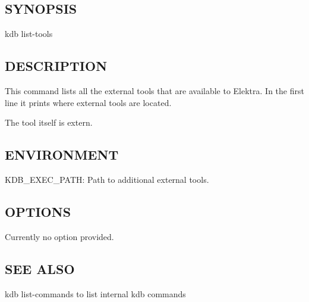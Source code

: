 \subsection*{S\+Y\+N\+O\+P\+S\+IS}

{\ttfamily kdb list-\/tools}

\subsection*{D\+E\+S\+C\+R\+I\+P\+T\+I\+ON}

This command lists all the external tools that are available to Elektra. In the first line it prints where external tools are located.

The tool itself is extern.

\subsection*{E\+N\+V\+I\+R\+O\+N\+M\+E\+NT}


\begin{DoxyItemize}
\item {\ttfamily K\+D\+B\+\_\+\+E\+X\+E\+C\+\_\+\+P\+A\+TH}\+: Path to additional external tools.
\end{DoxyItemize}

\subsection*{O\+P\+T\+I\+O\+NS}

Currently no option provided.

\subsection*{S\+EE A\+L\+SO}


\begin{DoxyItemize}
\item {\ttfamily kdb list-\/commands} to list internal kdb commands 
\end{DoxyItemize}